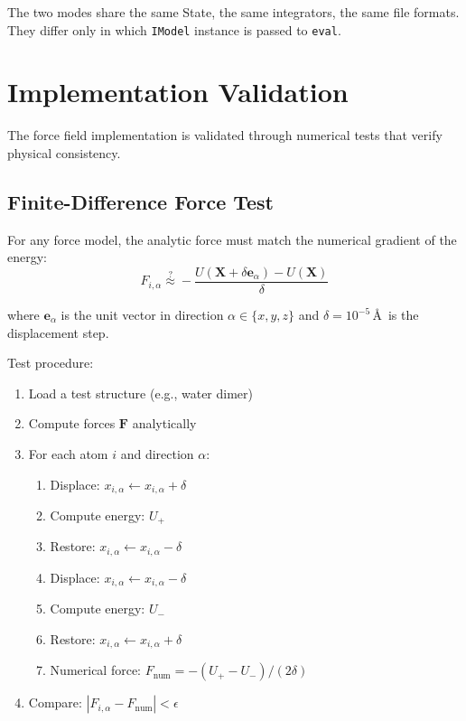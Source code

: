 \documentclass[11pt]{article}
\begin{document}
The two modes share the same State, the same integrators, the same file formats. They differ only in which \texttt{IModel} instance is passed to \texttt{eval}.

\section{Implementation Validation}

The force field implementation is validated through numerical tests that verify physical consistency.

\subsection{Finite-Difference Force Test}

For any force model, the analytic force must match the numerical gradient of the energy:
\begin{equation}
F_{i,\alpha} \stackrel{?}{\approx} -\frac{U(\mathbf{X} + \delta \mathbf{e}_\alpha) - U(\mathbf{X})}{\delta}
\end{equation}

where $\mathbf{e}_\alpha$ is the unit vector in direction $\alpha \in \{x,y,z\}$ and $\delta = 10^{-5}$\,\AA\ is the displacement step.

Test procedure:
\begin{enumerate}
\item Load a test structure (e.g., water dimer)
\item Compute forces $\mathbf{F}$ analytically
\item For each atom $i$ and direction $\alpha$:
    \begin{enumerate}
    \item Displace: $x_{i,\alpha} \gets x_{i,\alpha} + \delta$
    \item Compute energy: $U_+$
    \item Restore: $x_{i,\alpha} \gets x_{i,\alpha} - \delta$
    \item Displace: $x_{i,\alpha} \gets x_{i,\alpha} - \delta$
    \item Compute energy: $U_-$
    \item Restore: $x_{i,\alpha} \gets x_{i,\alpha} + \delta$
    \item Numerical force: $F_{\text{num}} = -(U_+ - U_-) / (2\delta)$
    \end{enumerate}
\item Compare: $|F_{i,\alpha} - F_{\text{num}}| < \epsilon$
\end{enumerate}
\end{document}
